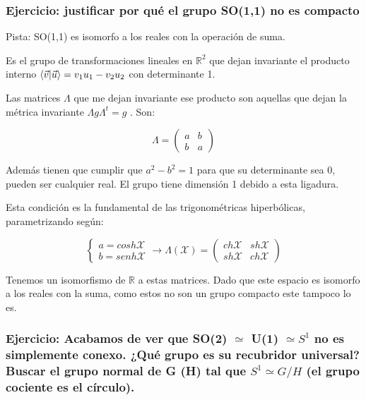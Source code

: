 \documentclass{article}
\begin{document}
     \subsubsection{Ejercicio: justificar por qué el grupo SO(1,1) no es compacto}

     Pista: SO(1,1) es isomorfo a los reales con la operación de suma.


     \bigskip
     Es el grupo de transformaciones lineales en $\mathds{R}^2$ que dejan invariante el producto interno $\braket{\Vec{v}|\Vec{u}}= v_1u_1 - v_2u_2$ con determinante 1.

     \smallskip
     Las matrices $\Lambda$ que me dejan invariante ese producto son aquellas que dejan la métrica invariante $\Lambda g \Lambda ^t =g$ . Son:

     $$\Lambda = \left (\begin{array}{cc}
        a  & b \\
         b & a
     \end{array} \right)$$

     Además tienen que cumplir que $a^2 -b^2=1$ para que su determinante sea 0, pueden ser cualquier real. El grupo tiene dimensión 1 debido a esta ligadura.

     Esta condición es la fundamental de las trigonométricas hiperbólicas, parametrizando según:

     $$\left \lbrace \begin{array}{cc}
          a=cosh \mathcal{X}  \\
         b=senh \mathcal{X}
     \end{array} \right .  \longrightarrow \Lambda (\mathcal{X})=\left ( \begin{array}{cc}
         ch\mathcal{X} & sh\mathcal{X} \\
       sh\mathcal{X}   & ch\mathcal{X}
     \end{array}\right)$$

     Tenemos un isomorfismo de $\mathds{R}$ a estas matrices. Dado que este espacio es isomorfo a los reales con la suma, como estos no son un grupo compacto este tampoco lo es.


     \subsubsection{Ejercicio: Acabamos de ver que SO(2) $\simeq$ U(1) $\simeq S^1$  no es simplemente conexo. ¿Qué grupo es su recubridor universal? Buscar el grupo normal de G (H) tal que $S^1 \simeq G/H$ (el grupo cociente es el círculo).}
\end{document}
